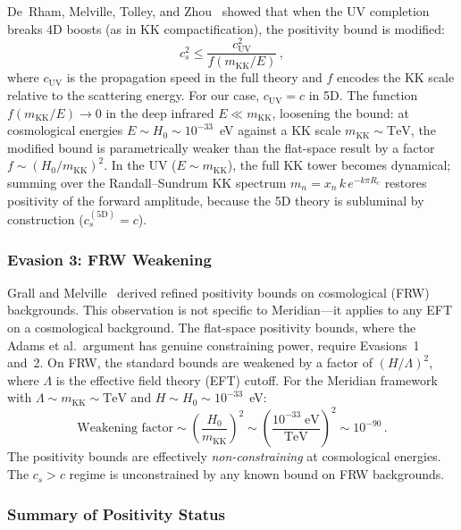 De~Rham, Melville, Tolley, and Zhou~\cite{ch5:deRhamMTZ2018} showed that when the UV completion breaks 4D boosts (as in KK compactification), the positivity bound is modified:
\begin{equation}
  c_s^2 \leq \frac{c_{\mathrm{UV}}^2}{f(m_{\mathrm{KK}}/E)}\,,
  \label{eq:5-modified-bound}
\end{equation}
where $c_{\mathrm{UV}}$ is the propagation speed in the full theory and $f$ encodes the KK scale relative to the scattering energy. For our case, $c_{\mathrm{UV}} = c$ in 5D. The function $f(m_{\mathrm{KK}}/E) \to 0$ in the deep infrared $E \ll m_{\mathrm{KK}}$, loosening the bound: at cosmological energies $E \sim H_0 \sim 10^{-33}$~eV against a KK scale $m_{\mathrm{KK}} \sim \mathrm{TeV}$, the modified bound is parametrically weaker than the flat-space result by a factor $f \sim (H_0/m_{\mathrm{KK}})^2$. In the UV ($E \sim m_{\mathrm{KK}}$), the full KK tower becomes dynamical; summing over the Randall--Sundrum KK spectrum $m_n = x_n\, k\, e^{-k\pi R_c}$ restores positivity of the forward amplitude, because the 5D theory is subluminal by construction ($c_s^{(\mathrm{5D})} = c$).

\subsubsection{Evasion 3: FRW Weakening}

Grall and Melville~\cite{ch5:GrallMelville2022} derived refined positivity bounds on cosmological (FRW) backgrounds. This observation is not specific to Meridian---it applies to any EFT on a cosmological background. The flat-space positivity bounds, where the Adams et al.\ argument has genuine constraining power, require Evasions~1 and~2. On FRW, the standard bounds are weakened by a factor of $(H/\Lambda)^2$, where $\Lambda$ is the effective field theory (EFT) cutoff. For the Meridian framework with $\Lambda \sim m_{\mathrm{KK}} \sim \mathrm{TeV}$ and $H \sim H_0 \sim 10^{-33}$~eV:
\begin{equation}
  \text{Weakening factor} \sim \left(\frac{H_0}{m_{\mathrm{KK}}}\right)^{\!2} \sim \left(\frac{10^{-33}\;\mathrm{eV}}{\mathrm{TeV}}\right)^{\!2} \sim 10^{-90}\,.
  \label{eq:5-frw-weakening}
\end{equation}
The positivity bounds are effectively \emph{non-constraining} at cosmological energies. The $c_s > c$ regime is unconstrained by any known bound on FRW backgrounds.

\subsubsection{Summary of Positivity Status}

